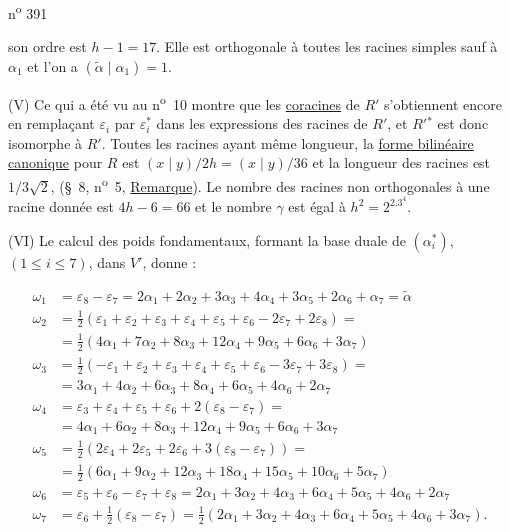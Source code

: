 \hfill n\textsuperscript{o} 391

son ordre est $h-1=17$. Elle est orthogonale à toutes les racines simples sauf à $\alpha_1$ et l'on a $(\tilde\alpha\mid\alpha_1)=1$.

(V) Ce qui a été vu au n\textsuperscript{o}~10 montre que les \uline{coracines} de $R'$ s'obtiennent encore en remplaçant $\varepsilon_i$ par $\varepsilon_i^*$ dans les expressions des racines de $R'$, et $R'{}^*$ est donc isomorphe à $R'$. Toutes les racines ayant même longueur, la \uline{forme bilinéaire canonique} pour $R$ est $(x\mid y)/2h=(x\mid y)/36$ et la longueur des racines est $1/3\sqrt{2}$, (\S~8, n\textsuperscript{o}~5, \uline{Remarque}). Le nombre des racines non orthogonales à une racine donnée est $4h-6=66$ et le nombre $\gamma$ est égal à $h^2=2^2.3^4$.

(VI) Le calcul des poids fondamentaux, formant la base duale de $(\alpha_i^*)$, $(1\leq i\leq7)$, dans $V'$, donne :

\[
\begin{aligned}
\omega_1&=\varepsilon_8-\varepsilon_7=2\alpha_1+2\alpha_2+3\alpha_3+4\alpha_4+3\alpha_5+2\alpha_6+\alpha_7=\tilde\alpha\\
\omega_2&=\frac{1}{2}(\varepsilon_1+\varepsilon_2+\varepsilon_3+\varepsilon_4+\varepsilon_5+\varepsilon_6-2\varepsilon_7+2\varepsilon_8)=\\
&=\frac{1}{2}(4\alpha_1+7\alpha_2+8\alpha_3+12\alpha_4+9\alpha_5+6\alpha_6+3\alpha_7)\\
\omega_3&=\frac{1}{2}(-\varepsilon_1+\varepsilon_2+\varepsilon_3+\varepsilon_4+\varepsilon_5+\varepsilon_6-3\varepsilon_7+3\varepsilon_8)=\\
&=3\alpha_1+4\alpha_2+6\alpha_3+8\alpha_4+6\alpha_5+4\alpha_6+2\alpha_7\\
\omega_4&=\varepsilon_3+\varepsilon_4+\varepsilon_5+\varepsilon_6+2(\varepsilon_8-\varepsilon_7)=\\
&=4\alpha_1+6\alpha_2+8\alpha_3+12\alpha_4+9\alpha_5+6\alpha_6+3\alpha_7\\
\omega_5&=\frac{1}{2}(2\varepsilon_4+2\varepsilon_5+2\varepsilon_6+3(\varepsilon_8-\varepsilon_7))=\\
&=\frac{1}{2}(6\alpha_1+9\alpha_2+12\alpha_3+18\alpha_4+15\alpha_5+10\alpha_6+5\alpha_7)\\
\omega_6&=\varepsilon_5+\varepsilon_6-\varepsilon_7+\varepsilon_8=2\alpha_1+3\alpha_2+4\alpha_3+6\alpha_4+5\alpha_5+4\alpha_6+2\alpha_7\\
\omega_7&=\varepsilon_6+\frac{1}{2}(\varepsilon_8-\varepsilon_7)=\frac{1}{2}(2\alpha_1+3\alpha_2+4\alpha_3+6\alpha_4+5\alpha_5+4\alpha_6+3\alpha_7).
\end{aligned}
\]

